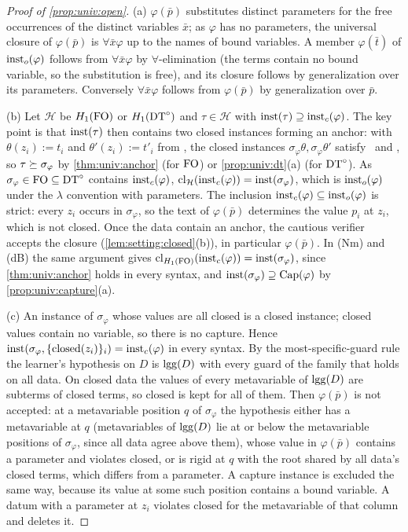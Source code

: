 \begin{proof}[Proof of \cref{prop:univ:open}]
(a) $\varphi(\bar p)$ substitutes distinct parameters for the free occurrences of the distinct variables $\bar x$; as $\varphi$ has no parameters, the universal closure of $\varphi(\bar p)$ is $\forall\bar x\varphi$ up to the names of bound variables. A member $\varphi(\bar t)$ of $\mathrm{inst}_{o}(\varphi)$ follows from $\forall\bar x\varphi$ by $\forall$-elimination (the terms contain no bound variable, so the substitution is free), and its closure follows by generalization over its parameters. Conversely $\forall\bar x\varphi$ follows from $\varphi(\bar p)$ by generalization over $\bar p$.

(b) Let $\mathcal H$ be $H_{1}(\mathrm{FO})$ or $H_{1}(\mathrm{DT}^{\circ})$ and $\tau\in\mathcal H$ with $\mathrm{inst}(\tau)\supseteq\mathrm{inst}_{c}(\varphi)$. The key point is that $\mathrm{inst}(\tau)$ then contains two closed instances forming an anchor: with $\theta(z_i):=t_i$ and $\theta'(z_i):=t'_i$ from \univRich, the closed instances $\sigma_\varphi\theta,\sigma_\varphi\theta'$ satisfy \evR\ and \evD, so $\tau\succeq\sigma_\varphi$ by \cref{thm:univ:anchor} (for $\mathrm{FO}$) or \cref{prop:univ:dt}(a) (for $\mathrm{DT}^{\circ}$). As $\sigma_\varphi\in\mathrm{FO}\subseteq\mathrm{DT}^{\circ}$ contains $\mathrm{inst}_{c}(\varphi)$, $\mathrm{cl}_{\mathcal H}(\mathrm{inst}_{c}(\varphi))=\mathrm{inst}(\sigma_\varphi)$, which is $\mathrm{inst}_{o}(\varphi)$ under the $\lambda$ convention with parameters. The inclusion $\mathrm{inst}_{c}(\varphi)\subseteq\mathrm{inst}_{o}(\varphi)$ is strict: every $z_i$ occurs in $\sigma_\varphi$, so the text of $\varphi(\bar p)$ determines the value $p_i$ at $z_i$, which is not closed. Once the data contain an anchor, the cautious verifier accepts the closure (\cref{lem:setting:closed}(b)), in particular $\varphi(\bar p)$. In (Nm) and (dB) the same argument gives $\mathrm{cl}_{H_{1}(\mathrm{FO})}(\mathrm{inst}_{c}(\varphi))=\mathrm{inst}(\sigma_\varphi)$, since \cref{thm:univ:anchor} holds in every syntax, and $\mathrm{inst}(\sigma_\varphi)\supseteq\mathrm{Cap}(\varphi)$ by \cref{prop:univ:capture}(a).

(c) An instance of $\sigma_\varphi$ whose values are all closed is a closed instance; closed values contain no variable, so there is no capture. Hence $\mathrm{inst}(\sigma_\varphi,\{\mathrm{closed}(z_i)\}_i)=\mathrm{inst}_{c}(\varphi)$ in every syntax. By the most-specific-guard rule the learner's hypothesis on $D$ is $\mathrm{lgg}(D)$ with every guard of the family that holds on all data. On closed data the values of every metavariable of $\mathrm{lgg}(D)$ are subterms of closed terms, so $\mathrm{closed}$ is kept for all of them. Then $\varphi(\bar p)$ is not accepted: at a metavariable position $q$ of $\sigma_\varphi$ the hypothesis either has a metavariable at $q$ (metavariables of $\mathrm{lgg}(D)$ lie at or below the metavariable positions of $\sigma_\varphi$, since all data agree above them), whose value in $\varphi(\bar p)$ contains a parameter and violates $\mathrm{closed}$, or is rigid at $q$ with the root shared by all data's closed terms, which differs from a parameter. A capture instance is excluded the same way, because its value at some such position contains a bound variable. A datum with a parameter at $z_i$ violates $\mathrm{closed}$ for the metavariable of that column and deletes it.
\end{proof}

